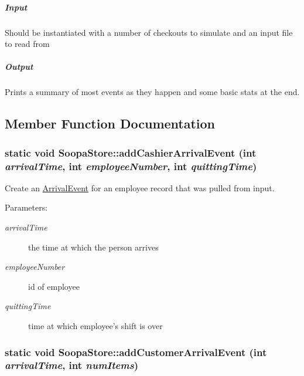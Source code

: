 \subparagraph*{Input}

Should be instantiated with a number of checkouts to simulate and an input file to read from

\subparagraph*{Output}

Prints a summary of most events as they happen and some basic stats at the end. 

\subsection{Member Function Documentation}
\hypertarget{class_soopa_store_07531dfae1141f6fe1874d7c535c2c37}{
\subsubsection[{addCashierArrivalEvent}]{\setlength{\rightskip}{0pt plus 5cm}static void SoopaStore::addCashierArrivalEvent (int {\em arrivalTime}, \/  int {\em employeeNumber}, \/  int {\em quittingTime})}}
\label{class_soopa_store_07531dfae1141f6fe1874d7c535c2c37}


Create an \hyperlink{class_arrival_event}{ArrivalEvent} for an employee record that was pulled from input. 

\begin{Desc}
\item[Parameters:]
\begin{description}
\item[{\em arrivalTime}]the time at which the person arrives \item[{\em employeeNumber}]id of employee \item[{\em quittingTime}]time at which employee's shift is over \end{description}
\end{Desc}
\hypertarget{class_soopa_store_8f06afcdd8fd1d442039bf152cbbfe00}{
\subsubsection[{addCustomerArrivalEvent}]{\setlength{\rightskip}{0pt plus 5cm}static void SoopaStore::addCustomerArrivalEvent (int {\em arrivalTime}, \/  int {\em numItems})}}
\label{class_soopa_store_8f06afcdd8fd1d442039bf152cbbfe00}


